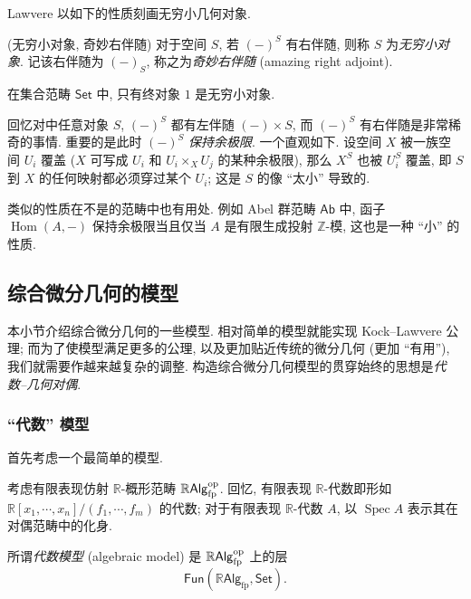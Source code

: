 Lawvere 以如下的性质刻画无穷小几何对象.

\begin{definition}
	{(无穷小对象, 奇妙右伴随)}
	对于空间 $S$, 若 $(-)^S$ 有右伴随, 则称 $S$ 为\emph{无穷小对象}. 记该右伴随为 $(-)_S$, 称之为\emph{奇妙右伴随} (amazing right adjoint).
\end{definition}

\begin{example}
	{}
	在集合范畴 $\mathsf {Set}$ 中, 只有终对象 $1$ 是无穷小对象.
\end{example}

\begin{remark}
	[label={infinitesimal-object-intuition}]
	{}
	回忆对\topos{}中任意对象 $S$, $(-)^S$ 都有左伴随 $(-)\times S$, 而 $(-)^S$ 有右伴随是非常稀奇的事情. 重要的是此时 $(-)^S$ \emph{保持余极限}. 一个直观如下. 设空间 $X$ 被一族空间 $U_i$ 覆盖 ($X$ 可写成 $U_i$ 和 $U_i\times_X U_j$ 的某种余极限), 那么 $X^S$ 也被 $U_i^S$ 覆盖, 即 $S$ 到 $X$ 的任何映射都必须穿过某个 $U_i$; 这是 $S$ 的像 ``太小'' 导致的.
	
	类似的性质在不是\topos{}的范畴中也有用处. 例如 Abel 群范畴 $\mathsf {Ab}$ 中, 函子 $\operatorname{Hom}(A,{-})$ 保持余极限当且仅当 $A$ 是有限生成投射 $\mathbb{Z}$-模, 这也是一种 ``小'' 的性质.
	
\end{remark}



\subsection{综合微分几何的模型}

本小节介绍综合微分几何的一些模型. 相对简单的模型就能实现 Kock--Lawvere 公理; 而为了使模型满足更多的公理, 以及更加贴近传统的微分几何 (更加 ``有用''), 我们就需要作越来越复杂的调整.
构造综合微分几何模型的贯穿始终的思想是\emph{代数--几何对偶}.

\subsubsection{``代数'' 模型}

首先考虑一个最简单的模型.
\begin{definition}
	[label={SDG-algebraic-model}]
	{}
	考虑有限表现仿射 $\mathbb{R}$-概形范畴 $\mathbb{R}\mathsf{Alg}_{\text{fp}}^{\text{op}}$.
	回忆, 有限表现 $\mathbb{R}$-代数即形如 $\mathbb{R}[x_1,\cdots,x_n]/(f_1,\cdots,f_m)$ 的代数; 对于有限表现 $\mathbb{R}$-代数 $A$, 以 $\operatorname{Spec} A$ 表示其在对偶范畴中的化身.
	
	所谓\emph{代数模型} (algebraic model) 是 $\mathbb{R}\mathsf{Alg}_{\text{fp}}^{\text{op}}$ 上的层\topos{} $$\mathsf {Fun}(\mathbb{R}\mathsf{Alg}_{\text{fp}},\mathsf {Set}).$$
\end{definition}


